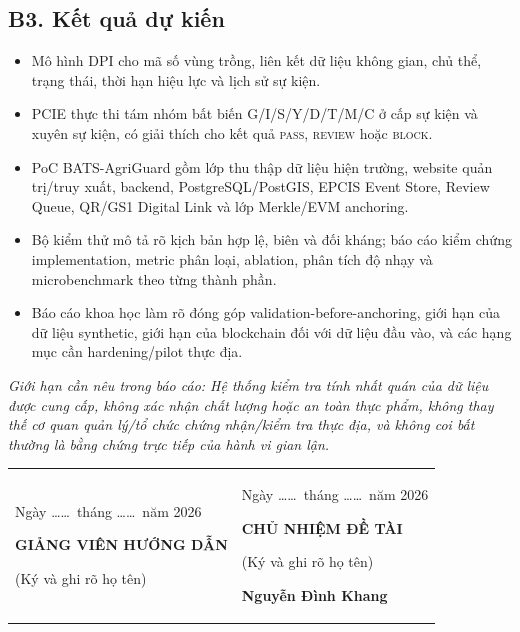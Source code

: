\documentclass[letterpaper,11pt]{article}
\begin{document}
\subsection*{B3. Kết quả dự kiến}
\begin{itemize}
  \item Mô hình DPI cho mã số vùng trồng, liên kết dữ liệu không gian, chủ thể, trạng thái, thời hạn hiệu lực và lịch sử sự kiện.
  \item PCIE thực thi tám nhóm bất biến G/I/S/Y/D/T/M/C ở cấp sự kiện và xuyên sự kiện, có giải thích cho kết quả \textsc{pass}, \textsc{review} hoặc \textsc{block}.
  \item PoC BATS-AgriGuard gồm lớp thu thập dữ liệu hiện trường, website quản trị/truy xuất, backend, PostgreSQL/PostGIS, EPCIS Event Store, Review Queue, QR/GS1 Digital Link và lớp Merkle/EVM anchoring.
  \item Bộ kiểm thử mô tả rõ kịch bản hợp lệ, biên và đối kháng; báo cáo kiểm chứng implementation, metric phân loại, ablation, phân tích độ nhạy và microbenchmark theo từng thành phần.
  \item Báo cáo khoa học làm rõ đóng góp validation-before-anchoring, giới hạn của dữ liệu synthetic, giới hạn của blockchain đối với dữ liệu đầu vào, và các hạng mục cần hardening/pilot thực địa.
\end{itemize}
\textit{Giới hạn cần nêu trong báo cáo: Hệ thống kiểm tra tính nhất quán của dữ liệu được cung cấp, không xác nhận chất lượng hoặc an toàn thực phẩm, không thay thế cơ quan quản lý/tổ chức chứng nhận/kiểm tra thực địa, và không coi bất thường là bằng chứng trực tiếp của hành vi gian lận.}

\printbibliography[title={B4. Tài liệu tham khảo}]

\vfill
\begin{tabularx}{\textwidth}{XX}
\centering Ngày \ldots\ldots\ tháng \ldots\ldots\ năm 2026\par
\textbf{GIẢNG VIÊN HƯỚNG DẪN}\par
(Ký và ghi rõ họ tên) &
\centering Ngày \ldots\ldots\ tháng \ldots\ldots\ năm 2026\par
\textbf{CHỦ NHIỆM ĐỀ TÀI}\par
(Ký và ghi rõ họ tên)\par\vspace{3.4cm}\textbf{Nguyễn Đình Khang}
\end{tabularx}
\end{document}
